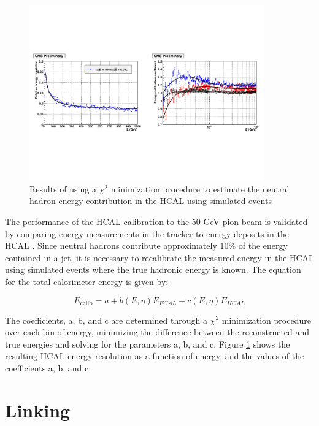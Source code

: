 \begin{figure}[h]
   \centering
  \includegraphics[width=0.9\textwidth]{Figures/Reconstruction_Diagrams/HCAL_calibration_chi2_fit_from_ecal.pdf}
  \caption{Results of using a $\chi^{2}$ minimization procedure to
    estimate the neutral hadron energy contribution in the HCAL using
    simulated events} \label{fig:hcal_calibration}
\end{figure}

\par The performance of the HCAL calibration to the 50 GeV pion beam is
validated by comparing energy measurements in the tracker to energy
deposits in the HCAL \cite{CMS-DP-2010-025}.  Since neutral hadrons
contribute approximately 10$\%$ of the energy contained in a jet, it is
necessary to recalibrate the measured energy in the HCAL using
simulated events where the true hadronic energy is known.  The
equation for the total calorimeter energy is given by:

\begin{equation}\label{eq:calorimeter_calibration}
E_{\text{calib}} = a + b(E, \eta)E_{ECAL} + c(E, \eta)E_{HCAL}
\end{equation} 

\noindent The coefficients, a, b, and c are determined through a
$\chi^{2}$ minimization procedure over each bin of energy, minimizing
the difference between the reconstructed and true energies and solving
for the parameters a, b, and c.  Figure \ref{fig:hcal_calibration}
shows the resulting HCAL energy resolution as a function of energy,
and the values of the coefficients a, b, and c.  


\section{Linking}
\label{linking_overview}

